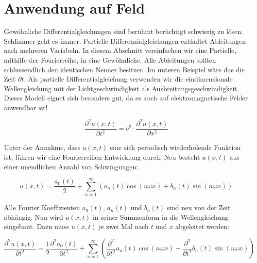 %
%
%
%



\section{Anwendung auf Feld\label{fourier:section:AnwendungAufFeld}}
Gewöhnliche Differentialgleichungen sind berühmt berüchtigt schwierig zu lösen.
Schlimmer geht es immer.
Partielle Differenzialgleichungen enthaltet Ableitungen nach mehreren Variabeln.
In diesem Abschnitt vereinfachen wir eine Partielle, mithilfe der Fourierreihe, in eine Gewöhnliche.
Alle Ableitungen sollten schlussendlich den identischen Nenner besitzen. 
Im unteren Beispiel wäre das die Zeit $\partial t$.
Als partielle Differentialgleichung verwenden wir die eindimensionale Wellengleichung mit der Lichtgeschwindigkeit als Ausbreitungsgeschwindigkeit. 
Dieses Modell eignet sich besonders gut, da es auch auf elektromagnetische Felder anwendbar ist!

\begin{equation}
	\frac{\partial^2 u(x, t)}{\partial t^2} = c^2 \cdot \frac{\partial^2 u(x, t)}{\partial x^2}
\end{equation}

Unter der Annahme, dass $u(x, t)$ eine sich periodisch wiederholende Funktion ist, führen wir eine Fourierreihen-Entwicklung durch. 
Neu besteht $u(x, t)$ aus einer unendlichen Anzahl von Schwingungen:

\begin{equation}
	u(x,t) = \frac{a_0(t)}{2} + \sum_{n=1}^{\infty} \left( a_n(t) \cos(n \omega x) + b_n(t) \sin(n \omega x) \right)
\end{equation}

Alle Fourier Koeffizienten $a_0(t)$, $a_n(t)$ und $b_n(t)$ sind neu von der Zeit abhängig. 
Nun wird $u(x,t)$ in seiner Summenform in die Wellengleichung eingebaut. 
Dazu muss $u(x,t)$ je zwei Mal nach $t$ und $x$ abgeleitet werden:

\begin{equation}
	\frac{\partial^2 u(x,t)}{\partial t^2} = \frac{1}{2} \frac{\partial^2 a_0(t)}{\partial t^2} +  \sum_{n=1}^{\infty} \left( \frac{\partial^2}{\partial t^2} a_n(t) \cos(n \omega x) + \frac{\partial^2}{\partial t^2} b_n(t) \sin(n \omega x) \right)
\end{equation}

